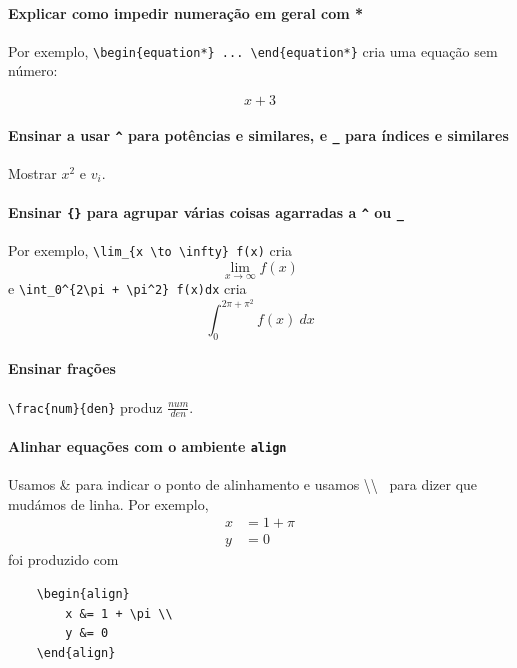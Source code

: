 \documentclass[11pt]{article}
\begin{document}
\paragraph{Explicar como impedir numeração em geral com *}
Por exemplo, \verb|\begin{equation*} ... \end{equation*}| cria uma equação
sem número:

\begin{equation*}
    x + 3
\end{equation*}

\paragraph{Ensinar a usar \texttt{\^} para potências e similares,
e \texttt{\_} para índices e similares}
Mostrar $x^2$ e $v_i$.

\paragraph{Ensinar \texttt{\{\}} para agrupar várias coisas agarradas a
\texttt{\^} ou \texttt{\_}}
Por exemplo, \verb|\lim_{x \to \infty} f(x)| cria
$$\lim_{x \to \infty} f(x)$$
e \verb|\int_0^{2\pi + \pi^2} f(x)dx| cria
$$\int_0^{2\pi + \pi^2} f(x)~dx$$

\paragraph{Ensinar frações}
\verb|\frac{num}{den}| produz $\frac{num}{den}$.

\paragraph{Alinhar equações com o ambiente \texttt{align}}
Usamos \& para indicar o ponto de alinhamento e usamos \textbackslash\textbackslash~
para dizer que mudámos de linha. Por exemplo,
\begin{align}
    x &= 1 + \pi \\
    y &= 0
\end{align}
foi produzido com
\begin{verbatim}
    \begin{align}
        x &= 1 + \pi \\
        y &= 0
    \end{align}
\end{verbatim}
\end{document}
